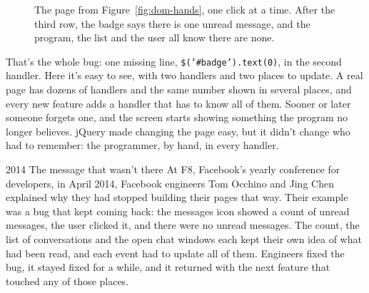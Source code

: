 \begin{figure}[htbp]
\centering
{}
\caption{The page from Figure~\ref{fig:dom-hands}, one click at a time. After
the third row, the badge says there is one unread message, and the program,
the list and the user all know there are none.}
\label{fig:dom-moments}
\end{figure}

That's the whole bug: one missing line, \texttt{\$('\#badge').text(0)}, in the
second handler. Here it's easy to see, with two handlers and two places to
update. A real page has dozens of handlers and the same number shown in
several places, and every new feature adds a handler that has to know all of
them. Sooner or later someone forgets one, and the screen starts showing
something the program no longer believes. jQuery made changing the page easy,
but it didn't change who had to remember: the programmer, by hand, in every
handler.

\begin{history}{2014 \textperiodcentered{} The message that wasn't there}
At F8, Facebook's yearly conference for developers, in April 2014, Facebook
engineers Tom Occhino and Jing Chen explained
why they had stopped building their pages that way. Their example was a bug
that kept coming back: the messages icon showed a count of unread messages, the
user clicked it, and there were no unread messages. The count, the list of
conversations and the open chat windows each kept their own idea of what had
been read, and each event had to update all of them. Engineers fixed the bug,
it stayed fixed for a while, and it returned with the next feature that touched
any of those places.
\end{history}

